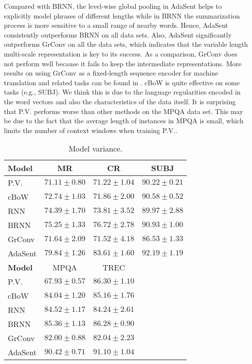 \documentclass{article}
\theoremstyle{definition}
\begin{document}
Compared with BRNN, the level-wise global pooling in AdaSent helps to explicitly model phrases of different lengths while in BRNN the summarization process is more sensitive to a small range of nearby words.  Hence, AdaSent consistently outperforms BRNN on all data sets. Also, AdaSent significantly outperforms GrConv on all the data sets, which indicates that the variable length multi-scale representation is key to its success. As a comparison, GrConv does not perform well because it fails to keep the intermediate representations. More results on using GrConv as a fixed-length sequence encoder for machine translation and related tasks can be found in \cite{cho2014properties}. cBoW is quite effective on some tasks (e.g., SUBJ). We think this is due to the language regularities encoded in the word vectors and also the characteristics of the data itself. It is surprising that P.V. performs worse than other methods on the MPQA data set. This may be due to the fact that the average length of instances in MPQA is small, which limits the number of context windows when training P.V..
\begin{table}[htb]
\small
\centering
\begin{tabular}{l||c|c|c}\hline
\textbf{Model} & MR & CR & SUBJ \\\hline
P.V. & $71.11\pm 0.80$ & $71.22\pm 1.04$ & $90.22\pm 0.21$ \\\hline
cBoW & $72.74\pm 1.03$ & $71.86\pm 2.00$ & $90.58\pm 0.52$ \\
RNN & $74.39\pm 1.70$ & $73.81\pm 3.52$ & $89.97\pm 2.88$  \\
BRNN & $75.25\pm 1.33$ & $76.72\pm 2.78$ & $90.93\pm 1.00$ \\
GrConv & $71.64\pm 2.09$ & $71.52\pm 4.18$ & $86.53\pm 1.33$ \\\hline
AdaSent & $\mathbf{79.84\pm 1.26}$ & $\mathbf{83.61\pm 1.60}$ & $\mathbf{92.19\pm 1.19}$ \\\hline\hline
\textbf{Model} & MPQA & TREC \\\hline
P.V. & $67.93\pm  0.57$ & $86.30\pm 1.10$ & \\\hline
cBoW & $84.04\pm 1.20$ & $85.16\pm 1.76$ & \\
RNN & $84.52\pm 1.17$ & $84.24\pm 2.61$ & \\
BRNN & $85.36\pm 1.13$ & $86.28\pm 0.90$ & \\
GrConv & $82.00\pm 0.88$ & $82.04\pm 2.23$\\\hline
AdaSent & $\mathbf{90.42\pm 0.71}$ & $\mathbf{91.10\pm 1.04}$ & \\\hline
\end{tabular}
\caption{Model variance.}
\label{table:robustness}
\end{table}
\end{document}
